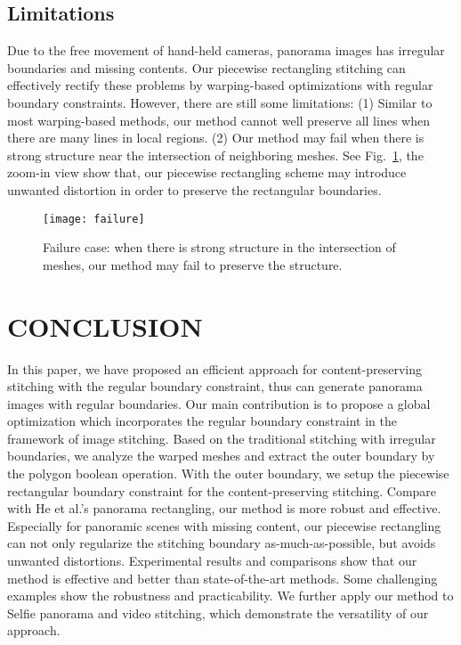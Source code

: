 \documentclass[10pt,journal,compsoc]{IEEEtran}
\begin{document}
  \subsection{Limitations}
Due to the free movement of hand-held cameras, panorama images has irregular boundaries and missing contents.
Our piecewise rectangling stitching can effectively rectify these problems by warping-based optimizations with regular boundary constraints.
However, there are still some limitations:
(1) Similar to most warping-based methods, our method cannot well preserve all lines when there are many lines in local regions.
(2) Our method may fail when there is strong structure near the intersection of neighboring meshes. See Fig.~\ref{fig:failure}, the zoom-in view show that, our piecewise rectangling scheme may introduce unwanted distortion in order to preserve the rectangular boundaries.

 \begin{figure} %
  \centering
  \texttt{[image: failure]}
  \caption{Failure case: when there is strong structure in the intersection of meshes, our method may fail to preserve the structure.} \label{fig:failure}
\end{figure}

 \section{CONCLUSION}
In this paper, we have proposed an efficient approach for content-preserving stitching with the regular boundary constraint, thus can generate panorama images with regular boundaries.
Our main contribution is to propose a global optimization which incorporates the regular boundary constraint in the framework of image stitching.
Based on the traditional stitching with irregular boundaries, we analyze the warped meshes and extract the outer boundary by the polygon boolean operation.
With the outer boundary, we setup the piecewise rectangular boundary constraint for the content-preserving stitching.
Compare with He et al.'s panorama rectangling, our method is more robust and effective.
Especially for panoramic scenes with missing content, our piecewise rectangling can not only regularize the stitching boundary as-much-as-possible, but avoids unwanted distortions.
Experimental results and comparisons show that our method is effective and better than state-of-the-art methods. Some challenging examples show the robustness and practicability.
We further apply our method to Selfie panorama and video stitching, which demonstrate the versatility of our approach.
\end{document}
